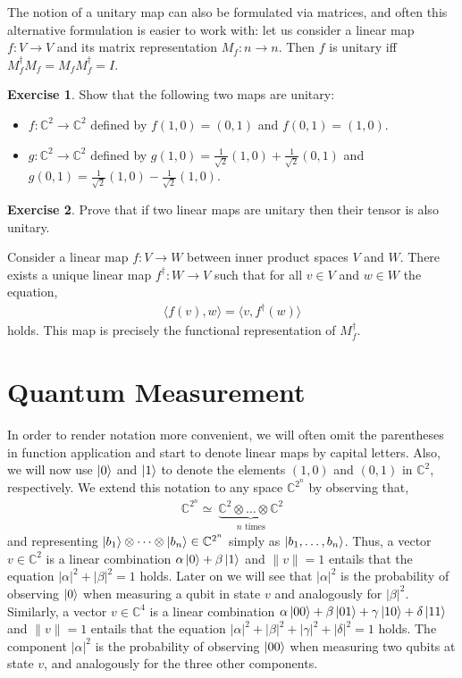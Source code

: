 \documentclass[a4paper, 11pt]{article}
\newcommand{\complex}{\mathbb{C}}
\theoremstyle{definition}
\newtheorem{exercise}{Exercise}
\begin{document}
The notion of a unitary map can also be formulated via matrices, and
often this alternative formulation is easier to work with: let us
consider a linear map $f : V \to V$ and its matrix representation
$M_f : n \to n$. Then $f$ is unitary iff
$M_f^\dagger M_f = M_f M_f^\dagger = I$.
\begin{exercise}
  Show that the following two maps are unitary:
  \begin{itemize}
  \item $f : \complex^2 \to \complex^2$ defined by $f(1,0) = (0,1)$ and
    $f(0,1) = (1,0)$.
  \item $g : \complex^2 \to \complex^2$ defined by
  $g(1,0) = \frac{1}{\sqrt{2}}(1,0) + \frac{1}{\sqrt{2}}(0,1)$ and
  $g(0,1) = \frac{1}{\sqrt{2}}(1,0) - \frac{1}{\sqrt{2}}(1,0)$.
  \end{itemize}
\end{exercise}

\begin{exercise}
  Prove that if two linear maps are unitary then their tensor is also
  unitary.
\end{exercise}

Consider a linear map $f : V \to W$ between inner product spaces $V$
and $W$. There exists a unique linear map $f^\dagger : W \to V$ such
that for all $v \in V$ and $w \in W$ the equation,
\begin{align*}
  \langle f (v), w \rangle = \langle v, f^\dagger (w) \rangle
\end{align*}
holds. This map is precisely the functional representation of
$M_f^\dagger$.

\section{Quantum Measurement}

In order to render notation more convenient, we will often omit the
parentheses in function application and start to denote linear maps by
capital letters. Also, we will now use $\ket{0}$ and $\ket{1}$ to
denote the elements $(1,0)$ and $(0,1)$ in $\complex^2$,
respectively. We extend this notation to any space $\complex^{2^n}$ by
observing that,
\begin{align*}
  \complex^{2^n} \simeq\ \underbrace{\complex^2 \otimes \dots \otimes \complex^2}_
  {n \text{ times} }
\end{align*}
and representing
$\ket{b_1} \otimes \dots \otimes \ket{b_n} \in \complex^{2^n}$ simply
as $\ket{b_1, \dots, b_n}$. Thus, a vector $v \in \complex^2$ is a
linear combination $\alpha \ket{0} + \beta \ket{1}$ and $\| v \| = 1$
entails that the equation $| \alpha |^2 + | \beta |^2 = 1$
holds. Later on we will see that $| \alpha |^2$ is the probability of
observing $\ket{0}$ when measuring a qubit in state $v$ and
analogously for $| \beta |^2$. Similarly, a vector $v \in \complex^4$
is a linear combination
$\alpha \ket{00} + \beta \ket{01} + \gamma \ket{10} + \delta \ket{11}$
and $\| v \| = 1$ entails that the equation
$| \alpha |^2 + | \beta |^2 + | \gamma |^2 + | \delta |^2 = 1$ holds. The
component $| \alpha |^2$ is the probability of observing $\ket{00}$
when measuring two qubits at state $v$, and analogously for the three
other components.
\end{document}
